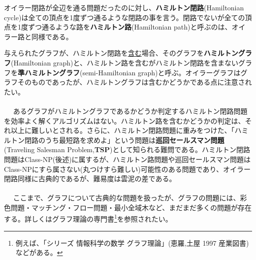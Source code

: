 オイラー閉路が全辺を通る問題だったのに対し、\textbf{ハミルトン閉路}(Hamiltonian cycle)は全ての頂点を1度ずつ通るような閉路の事を言う。閉路でないが全ての頂点を1度ずつ通るような路を\textbf{ハミルトン路}(Hamiltonian path)と呼ぶのは、オイラー路と同様である。

与えられたグラフが、ハミルトン閉路を\underline{含む}場合、そのグラフを\textbf{ハミルトングラフ}(Hamiltonian graph)と、ハミルトン路を含むがハミルトン閉路を含まないグラフを\textbf{準ハミルトングラフ}(semi-Hamiltonian graph)と呼ぶ。オイラーグラフはグラフそのものであったが、ハミルトングラフは含むかどうかである点に注意されたい。
\\ \\　
あるグラフがハミルトングラフであるかどうか判定するハミルトン閉路問題を効率よく解くアルゴリズムはない。ハミルトン路を含むかどうかの判定は、それ以上に難しいとされる。さらに、ハミルトン閉路問題に重みをつけた、「ハミルトン閉路のうち最短路を求めよ」という問題は\textbf{巡回セールスマン問題}(Traveling Salesman Problem,\textbf{TSP})として知られる難問である。ハミルトン閉路問題はClass-NP(後述)に属するが、ハミルトン路問題や巡回セールスマン問題はClass-NPにすら属さない(丸つけすら難しい)可能性のある問題であり、オイラー閉路同様に古典的であるが、難易度は雲泥の差である。
\\ \\　
ここまで、グラフについて古典的な問題を扱ったが、グラフの問題には、彩色問題・マッチング・フロー問題・最小全域木など、まだまだ多くの問題が存在する。詳しくはグラフ理論の専門書\footnote{例えば、「シリーズ 情報科学の数学 グラフ理論」(恵羅,土屋 1997 産業図書)などがある。}を参照されたい。

